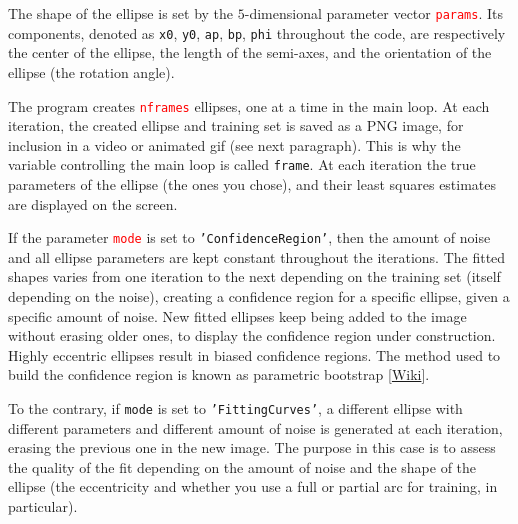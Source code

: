\documentclass[oneside,10pt]{book}
\begin{document}
The shape of the ellipse is set by the $5$-dimensional parameter vector \textcolor{red}{\texttt{params}}. Its components, denoted
 as \texttt{x0}, \texttt{y0}, \texttt{ap}, \texttt{bp}, \texttt{phi} throughout the code, are respectively the center of the ellipse, the length of the semi-axes, and the orientation of the ellipse (the rotation angle). \vspace{1ex}

 \vspace{1ex}

\noindent The program creates \textcolor{red}{\texttt{nframes}} ellipses, one at a time in the main loop.
 At each iteration, the created ellipse and training set is saved as a PNG image, for inclusion in a video or animated gif (see next paragraph). This is why the variable controlling the main loop is called  \texttt{frame}. At each iteration the true parameters of the ellipse (the ones you chose), and their least squares estimates are displayed on the screen.

If the parameter \textcolor{red}{\texttt{mode}} is set to \texttt{'ConfidenceRegion'}, then the amount of noise and all ellipse parameters are kept constant throughout the iterations. The fitted shapes varies from one iteration to the next depending on the training set (itself depending on the noise), creating a \textcolor{index}{confidence region} for a specific ellipse, given a specific amount of noise. New fitted ellipses keep being added to the image without erasing older ones, to display the confidence region under construction. Highly eccentric ellipses result in biased confidence regions.
 The method used to build the confidence region is known as \textcolor{index}{parametric bootstrap} [\href{https://en.wikipedia.org/wiki/Bootstrapping_(statistics)#Parametric_bootstrap}{Wiki}].

To the contrary, if \texttt{mode} is set to \texttt{'FittingCurves'}, a different ellipse with different parameters and different amount of noise is generated at each iteration, erasing the previous one in the new image. The purpose in this case is to assess the quality of the fit depending on the amount of noise and
 the shape of the ellipse (the eccentricity and whether you use a full or partial arc for training, in particular).\vspace{1ex}

 \vspace{1ex}
\end{document}
